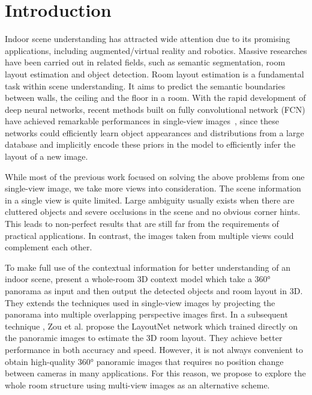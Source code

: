 \section{Introduction}

Indoor scene understanding has attracted wide attention due to its promising applications, including augmented/virtual reality and robotics. Massive researches have been carried out in related fields, such as semantic segmentation, room layout estimation and object detection. 
Room layout estimation is a fundamental task within scene understanding. It aims to predict the semantic boundaries between walls, the ceiling and the floor in a room. 
With the rapid development of deep neural networks, recent methods built on fully convolutional network (FCN) have achieved remarkable performances in single-view images~\cite{PIO,CFILE,DELAY,ICIP2018}, since these networks could efficiently learn object appearances and distributions from a large database and implicitly encode these priors in the model to efficiently infer the layout of a new image. 


While most of the previous work focused on solving the above problems from one single-view image, we take more views into consideration. 
%
The scene information in a single view is quite limited. 
Large ambiguity usually exists when there are cluttered objects and severe occlusions in the scene and no obvious corner hints.  
This leads to non-perfect results that are still far from the requirements of practical applications. 
%
In contrast, the images taken from multiple views could complement each other. 

To make full use of the contextual information for better understanding of an indoor scene, \cite{panocontext} present a whole-room 3D context model which take a \ang{360} panorama as input and then output the detected objects and room layout in 3D. They extends the techniques used in single-view images by projecting the panorama into multiple overlapping perspective images first. In a subsequent technique \cite{LayoutNet}, Zou et al. propose the LayoutNet network which trained directly on the panoramic images to estimate the 3D room layout. They achieve better performance in both accuracy and speed. However, it is not always convenient to obtain high-quality \ang{360} panoramic images that requires no position change between cameras in many applications. 
For this reason, we propose to explore the whole room structure using multi-view images  as an alternative scheme.

